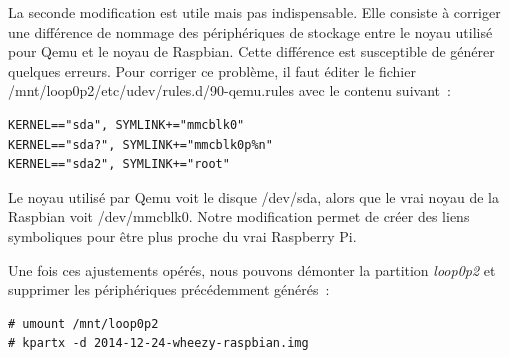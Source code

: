 \documentclass{article}
\begin{document}
La seconde modification est utile mais pas indispensable.
Elle consiste à corriger une différence de nommage des périphériques de stockage entre
le noyau utilisé pour Qemu et le noyau de Raspbian.
Cette différence est susceptible de générer quelques erreurs.
Pour corriger ce problème, il faut éditer le fichier \og{}/mnt/loop0p2/etc/udev/rules.d/90-qemu.rules\fg{}
avec le contenu suivant~:
\begin{verbatim}
KERNEL=="sda", SYMLINK+="mmcblk0"
KERNEL=="sda?", SYMLINK+="mmcblk0p%n"
KERNEL=="sda2", SYMLINK+="root"
\end{verbatim}

Le noyau utilisé par Qemu voit le disque \og{}/dev/sda\fg{}, alors que le
\og{}vrai\fg{} noyau de la Raspbian voit \og{}/dev/mmcblk0\fg{}.
Notre modification permet de créer des liens symboliques pour être plus
proche du vrai Raspberry Pi.

Une fois ces ajustements opérés, nous pouvons démonter la partition {\em
loop0p2} et supprimer les périphériques précédemment générés~:
\begin{verbatim}
# umount /mnt/loop0p2
# kpartx -d 2014-12-24-wheezy-raspbian.img
\end{verbatim}








\end{document}
